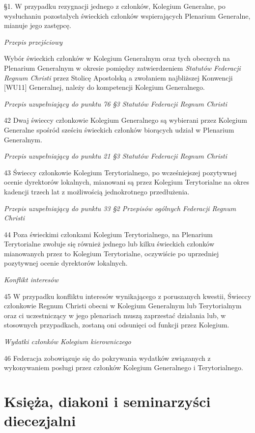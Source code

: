 ﻿\documentclass{report}
\newcommand{\lett}[1]{\lettrine[findent=6pt]{#1}{}}
\newcommand{\ssec}[1]{\vspace{1em}\textit{#1}\vspace{.5em}\nopagebreak}
\begin{document}
\S{}1. W przypadku rezygnacji jednego z członków, Kolegium Generalne, po wysłuchaniu pozostałych świeckich członków wspierających Plenarium Generalne, mianuje jego zastępcę.
 
\ssec{Przepis przejściowy}


Wybór świeckich członków w Kolegium Generalnym oraz tych obecnych na Plenarium Generalnym w okresie pomiędzy zatwierdzeniem {\em Statutów Federacji Regnum Christi} przez Stolicę Apostolską a zwołaniem najbliższej Konwencji [WU11] Generalnej, należy do kompetencji Kolegium Generalnego.
 
\ssec{Przepis uzupełniający do punktu 76 \S{}3 {\em Statutów Federacji Regnum Christi}}


\lett{42} Dwaj świeccy członkowie Kolegium Generalnego są wybierani przez Kolegium Generalne spośród sześciu świeckich członków biorących udział w Plenarium Generalnym.


\ssec{Przepis uzupełniający do punktu 21 \S{}3 {\em Statutów Federacji Regnum Christi}}


\lett{43} Świeccy członkowie Kolegium Terytorialnego, po wcześniejszej pozytywnej ocenie dyrektorów lokalnych, mianowani są przez Kolegium Terytorialne na okres kadencji trzech lat z możliwością jednokrotnego przedłużenia.


\ssec{Przepis uzupełniający do punktu 33 \S{}2 {\em Przepisów ogólnych Federacji Regnum Christi}}


\lett{44} Poza świeckimi członkami Kolegium Terytorialnego, na Plenarium Terytorialne zwołuje się również jednego lub kilku świeckich członków mianowanych przez to Kolegium Terytorialne, oczywiście po uprzedniej pozytywnej ocenie dyrektorów lokalnych.


\ssec{Konflikt interesów}


\lett{45} W przypadku konfliktu interesów wynikającego z poruszanych kwestii, Świeccy członkowie Regnum Christi obecni w Kolegium Generalnym lub Terytorialnym oraz ci uczestniczący w jego plenariach muszą zaprzestać działania lub, w stosownych przypadkach, zostaną oni odsunięci od funkcji przez Kolegium.


\ssec{Wydatki członków Kolegium kierowniczego}


\lett{46} Federacja zobowiązuje się do pokrywania wydatków związanych z wykonywaniem  posługi przez członków Kolegium Generalnego i Terytorialnego.
 
\part{Księża, diakoni i seminarzyści diecezjalni}
\end{document}
